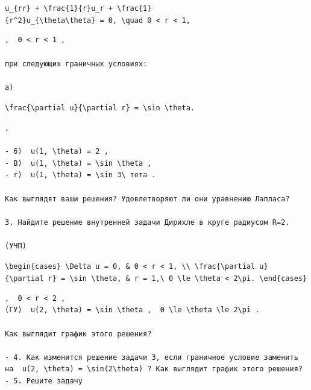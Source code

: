 \documentclass[
  ukrainian,
]{article}
\begin{document}
\texttt{u\_\{rr\}\ +\ \textbackslash{}frac\{1\}\{r\}u\_r\ +\ \textbackslash{}frac\{1\}\{r\^{}2\}u\_\{\textbackslash{}theta\textbackslash{}theta\}\ =\ 0,\ \textbackslash{}quad\ 0\ \textless{}\ r\ \textless{}\ 1,}

\begin{verbatim}
,  0 < r < 1 ,

при следующих граничных условиях:

a)
\end{verbatim}

\texttt{\textbackslash{}frac\{\textbackslash{}partial\ u\}\{\textbackslash{}partial\ r\}\ =\ \textbackslash{}sin\ \textbackslash{}theta.}

\begin{verbatim}
,

- 6)  u(1, \theta) = 2 ,
- B)  u(1, \theta) = \sin \theta ,
- r)  u(1, \theta) = \sin 3\ тета .

Как выглядят ваши решения? Удовлетворяют ли они уравнению Лапласа?

3. Найдите решение внутренней задачи Дирихле в круге радиусом R=2.

(УЧП)
\end{verbatim}

\texttt{\textbackslash{}begin\{cases\}\ \textbackslash{}Delta\ u\ =\ 0,\ \&\ 0\ \textless{}\ r\ \textless{}\ 1,\ \textbackslash{}\textbackslash{}\ \textbackslash{}frac\{\textbackslash{}partial\ u\}\{\textbackslash{}partial\ r\}\ =\ \textbackslash{}sin\ \textbackslash{}theta,\ \&\ r\ =\ 1,\textbackslash{}\ 0\ \textbackslash{}le\ \textbackslash{}theta\ \textless{}\ 2\textbackslash{}pi.\ \textbackslash{}end\{cases\}}

\begin{verbatim}
,  0 < r < 2 ,  
(ГУ)  u(2, \theta) = \sin \theta ,  0 \le \theta \le 2\pi .

Как выглядит график этого решения?

- 4. Как изменится решение задачи 3, если граничное условие заменить на  u(2, \theta) = \sin(2\theta) ? Как выглядит график этого решения?
- 5. Решите задачу
\end{verbatim}
\end{document}
